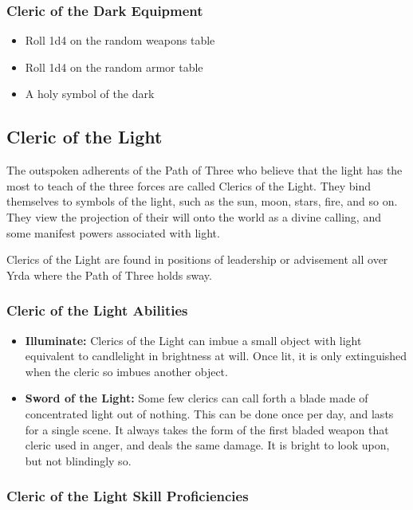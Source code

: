 \begin{multicols}{2}
\subsubsection{Cleric of the Dark Equipment}

\begin{itemize}
  \item Roll 1d4 on the random weapons table
  \item Roll 1d4 on the random armor table
  \item A holy symbol of the dark
\end{itemize}

\subsection{Cleric of the Light}

The outspoken adherents of the Path of Three who believe that the
light has the most to teach of the three forces are called Clerics
of the Light. They bind themselves to symbols of the light, such as
the sun, moon, stars, fire, and so on. They view the projection of
their will onto the world as a divine calling, and some manifest
powers associated with light.

Clerics of the Light are found in positions of leadership or advisement
all over Yrda where the Path of Three holds sway.

\subsubsection{Cleric of the Light Abilities}

\begin{itemize}
  \item \textbf{Illuminate:} Clerics of the Light can imbue a small object
    with light equivalent to candlelight in brightness at will. Once lit,
    it is only extinguished when the cleric so imbues another object.
  \item \textbf{Sword of the Light:} Some few clerics can call forth a
    blade made of concentrated light out of nothing. This can be done once
    per day, and lasts for a single scene. It always takes the form of the
    first bladed weapon that cleric used in anger, and deals the same damage.
    It is bright to look upon, but not blindingly so.
\end{itemize}

\subsubsection{Cleric of the Light Skill Proficiencies}


\end{multicols}
